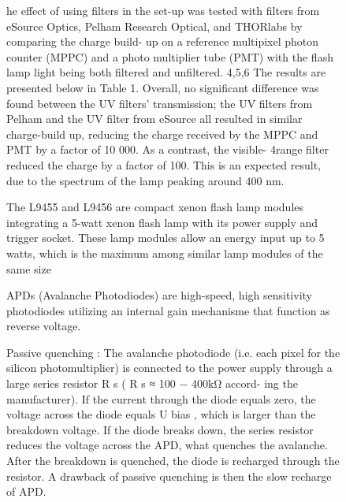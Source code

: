 \begin{figure}[!hbtp]
  he effect of using filters in the set-up was tested with filters from eSource
  Optics, Pelham Research Optical, and THORlabs by comparing the charge build-
  up on a reference multipixel photon counter (MPPC) and a photo multiplier tube
  (PMT) with the flash lamp light being both filtered and unfiltered. 4,5,6 The results
  are presented below in Table 1. Overall, no significant difference was found
  between the UV filters' transmission; the UV filters from Pelham and the UV
  filter from eSource all resulted in similar charge-build up, reducing the charge
  received by the MPPC and PMT by a factor of 10 000. As a contrast, the visible-
  4range filter reduced the charge by a factor of 100. This is an expected result, due
  to the spectrum of the lamp peaking around 400 nm.

  The L9455 and L9456 are compact xenon flash lamp modules integrating a 5-watt xenon flash lamp with its power supply and trigger socket.
  These lamp modules allow an energy input up to 5 watts, which is the maximum among similar lamp modules of the same size



  APDs (Avalanche Photodiodes) are high-speed, high sensitivity photodiodes utilizing an internal gain mechanisme that function as reverse voltage. 
  
  Passive quenching : The avalanche photodiode (i.e. each pixel for the silicon photomultiplier) is
connected to the power supply through a large series resistor R s ( R s ≈ 100 − 400kΩ accord-
ing the manufacturer). If the current through the diode equals zero, the voltage across the diode
equals U bias , which is larger than the breakdown voltage. If the diode breaks down, the series
resistor reduces the voltage across the APD, what quenches the avalanche. After the breakdown is
quenched, the diode is recharged through the resistor. A drawback of passive quenching is then the
slow recharge of APD.



\end{figure}
